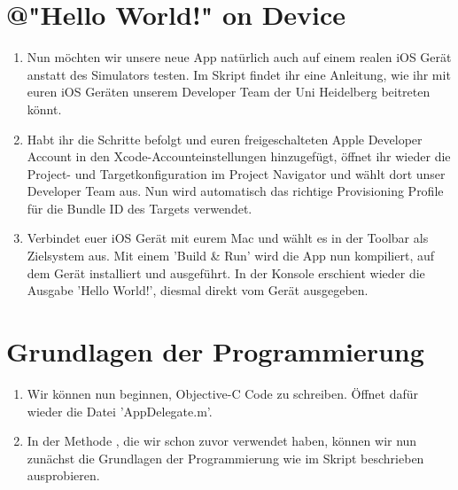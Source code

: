 \documentclass[parskip=half, final]{scrreprt}
\begin{document}
\section{@"Hello World!"{} on Device}

\begin{enumerate}

\item Nun möchten wir unsere neue App natürlich auch auf einem realen iOS Gerät anstatt des Simulators testen. Im Skript findet ihr eine Anleitung, wie ihr mit euren iOS Geräten unserem Developer Team der Uni Heidelberg beitreten könnt.

\item Habt ihr die Schritte befolgt und euren freigeschalteten Apple Developer Account in den Xcode-Accounteinstellungen hinzugefügt, öffnet ihr wieder die Project- und Targetkonfiguration im Project Navigator und wählt dort unser Developer Team  aus. Nun wird automatisch das richtige Provisioning Profile für die Bundle ID des Targets verwendet.


\item Verbindet euer iOS Gerät mit eurem Mac und wählt es in der Toolbar als Zielsystem aus. Mit einem 'Build \& Run' wird die App nun kompiliert, auf dem Gerät installiert und ausgeführt. In der Konsole erschient wieder die Ausgabe 'Hello World!', diesmal direkt vom Gerät ausgegeben.

\end{enumerate}

\section{Grundlagen der Programmierung}

\begin{enumerate}

\item Wir können nun beginnen, Objective-C Code zu schreiben. Öffnet dafür wieder die Datei 'AppDelegate.m'.

\item In der Methode , die wir schon zuvor verwendet haben, können wir nun zunächst die Grundlagen der Programmierung wie im Skript beschrieben ausprobieren.

\end{enumerate}
\end{document}
